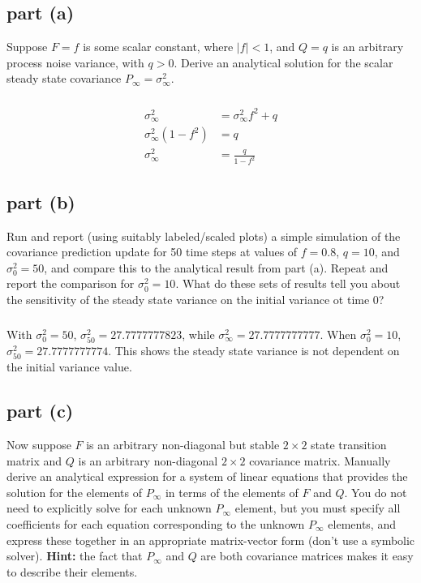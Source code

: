 \documentclass[11pt]{article}
\begin{document}
\subsection*{part (a)}
Suppose $F=f$ is some scalar constant, where $|f|<1$, and $Q=q$ is an arbitrary process noise variance, with $q>0$. Derive an analytical solution for the scalar steady state covariance $P_\infty=\sigma_\infty^2$.

\subparagraph*{}
\begin{align*}
	\sigma_\infty^2&=\sigma_\infty^2f^2+q \\
	\sigma_\infty^2(1-f^2)&=q \\
	\sigma_\infty^2 &= \frac{q}{1-f^2}
\end{align*}

\subsection*{part (b)}
Run and report (using suitably labeled/scaled plots) a simple simulation of the covariance prediction update for 50 time steps at values of $f=0.8$, $q=10$, and $\sigma_0^2=50$, and compare this to the analytical result from part (a). Repeat and report the comparison for $\sigma_0^2=10$. What do these sets of results tell you about the sensitivity of the steady state variance on the initial variance ot time 0?

\subparagraph*{}
With $\sigma_0^2=50$, $\sigma_{50}^2=27.7777777823$, while $\sigma_\infty^2=27.7777777777$. When $\sigma_0^2=10$, $\sigma_{50}^2=27.7777777774$. This shows the steady state variance is not dependent on the initial variance value.

\subsection*{part (c)}
Now suppose $F$ is an arbitrary non-diagonal but stable $2\times2$ state transition matrix and $Q$ is an arbitrary non-diagonal $2\times2$ covariance matrix. Manually derive an analytical expression for a system of linear equations that provides the solution for the elements of $P_\infty$ in terms of the elements of $F$ and $Q$. You do not need to explicitly solve for each unknown $P_\infty$ element, but you must specify all coefficients for each equation corresponding to the unknown $P_\infty$ elements, and express these together in an appropriate matrix-vector form (don't use a symbolic solver). \textbf{Hint:} the fact that $P_\infty$ and $Q$ are both covariance matrices makes it easy to describe their elements.
\end{document}
